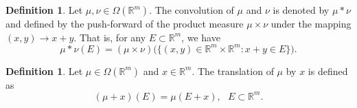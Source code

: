 \documentclass{amsproc}
\theoremstyle{definition}
\newtheorem{definition}[theorem]{Definition}
\theoremstyle{remark}
\numberwithin{equation}{section}
\begin{document}





\begin{definition}
Let $\mu, \mathfrak{\nu} \in \Omega(\mathbb{R}^m).$ The convolution of $\mu$ and $\mathfrak{\nu}$ is denoted by $\mu *\mathfrak{\nu}$ and defined by the push-forward of the product measure $\mu \times \mathfrak{\nu}$ under the mapping $(x,y)\to x+y.$ That is, for any $E \subset \mathbb{R}^m$, we have $$\mu * \mathfrak{\nu} (E)= (\mu \times \mathfrak{\nu} )\big(\{(x,y) \in \mathbb{R}^m\times \mathbb{R}^m: x+y \in E\}\big).$$
\end{definition}
\begin{definition}
Let $\mu \in \Omega(\mathbb{R}^m)$ and $x \in \mathbb{R}^m.$ The translation of $\mu$ by $x$ is defined as 
\[
(\mu+x)(E)=\mu(E+x),~~~E \subset \mathbb{R}^m.
\]
\end{definition}
\end{document}
